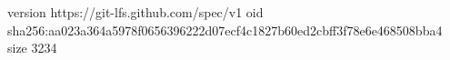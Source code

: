 version https://git-lfs.github.com/spec/v1
oid sha256:aa023a364a5978f0656396222d07ecf4c1827b60ed2cbff3f78e6e468508bba4
size 3234
